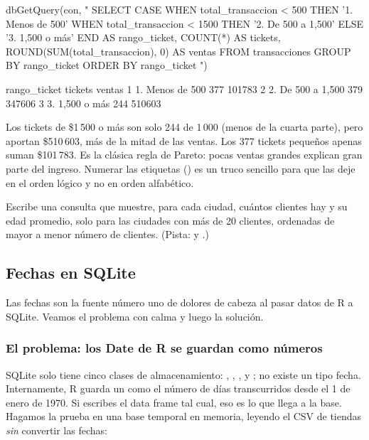 \begin{rcode}
dbGetQuery(con, "
  SELECT CASE
           WHEN total_transaccion < 500  THEN '1. Menos de 500'
           WHEN total_transaccion < 1500 THEN '2. De 500 a 1,500'
           ELSE '3. 1,500 o más'
         END AS rango_ticket,
         COUNT(*) AS tickets,
         ROUND(SUM(total_transaccion), 0) AS ventas
  FROM transacciones
  GROUP BY rango_ticket
  ORDER BY rango_ticket
")
\end{rcode}

\begin{rsalida}
       rango_ticket tickets ventas
1   1. Menos de 500     377 101783
2 2. De 500 a 1,500     379 347606
3    3. 1,500 o más     244 510603
\end{rsalida}

Los tickets de \$1\,500 o más son solo 244 de 1\,000 (menos de la cuarta
parte), pero aportan \$510\,603, más de la mitad de las ventas. Los 377
tickets pequeños apenas suman \$101\,783. Es la clásica regla de Pareto:
pocas ventas grandes explican gran parte del ingreso. Numerar las etiquetas () es un
truco sencillo para que  las deje en el orden lógico y no
en orden alfabético.

\begin{hazlotu}
Escribe una consulta que muestre, para cada ciudad, cuántos clientes hay y
su edad promedio, solo para las ciudades con más de 20 clientes, ordenadas
de mayor a menor número de clientes. (Pista:  y
.)
\end{hazlotu}

\subsection{Fechas en SQLite}
\label{sec:m5-fechas}

Las fechas son la fuente número uno de dolores de cabeza al pasar datos de
R a SQLite. Veamos el problema con calma y luego la solución.

\subsubsection{El problema: los Date de R se guardan como números}

SQLite solo tiene cinco clases de almacenamiento: ,
, ,  y ; no existe un
tipo fecha. Internamente, R guarda un  como el número de días
transcurridos desde el 1 de enero de 1970. Si escribes el data frame tal
cual, eso es lo que llega a la base. Hagamos la prueba en una base temporal
en memoria, leyendo el CSV de tiendas \emph{sin} convertir las fechas:

